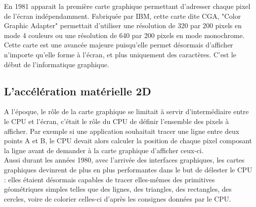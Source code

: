 En 1981 apparait la première carte graphique permettant d'adresser chaque pixel de l'écran indépendamment.
Fabriquée par IBM, cette carte dite CGA, "Color Graphic Adapter" permettait d'utiliser une résolution de 320 par 200 pixels en mode 4 couleurs ou une résolution de 640 par 200 pixels en mode monochrome.\\
Cette carte est une avancée majeure puisqu'elle permet désormais d'afficher n'importe qu'elle forme à l'écran, et plus uniquement des caractères. C'est le début de l'informatique graphique.

\subsection{L'accélération matérielle 2D}

A l'époque, le rôle de la carte graphique se limitait à servir d'intermédiaire entre le CPU et l'écran, c'était le rôle du CPU de définir l'ensemble des pixels à afficher. Par exemple si une application souhaitait tracer une ligne entre deux points A et B, le CPU devait alors calculer la position de chaque pixel composant la ligne avant de demander à la carte graphique d'afficher ceux-ci.\\
Aussi durant les années 1980, avec l'arrivée des interfaces graphiques, les cartes graphiques devinrent de plus en plus performantes dans le but de délester le CPU : elles étaient désormais capables de tracer elles-mêmes des primitives géométriques simples telles que des lignes, des triangles, des rectangles, des cercles, voire de colorier celles-ci d'après les consignes données par le CPU.\\

 